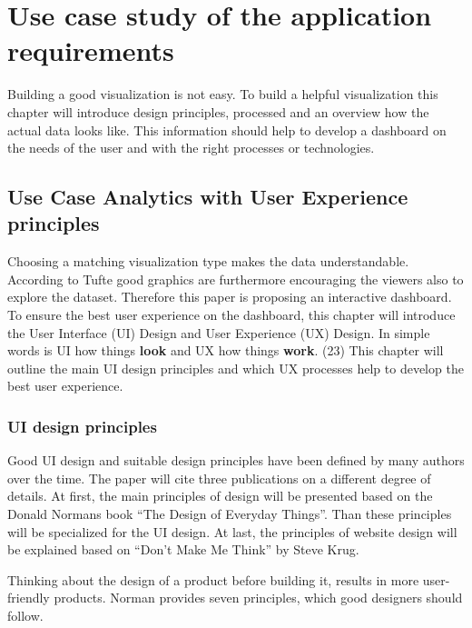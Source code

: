 \documentclass[american,a4paper,oneside,,tablecaptionabove]{scrbook}
\begin{document}
\chapter{Use case study of the application
requirements}\label{use-case-study-of-the-application-requirements}

Building a good visualization is not easy. To build a helpful
visualization this chapter will introduce design principles, processed
and an overview how the actual data looks like. This information should
help to develop a dashboard on the needs of the user and with the right
processes or technologies.

\section{Use Case Analytics with User Experience
principles}\label{use-case-analytics-with-user-experience-principles}

Choosing a matching visualization type makes the data understandable.
According to Tufte good graphics are furthermore encouraging the viewers
also to explore the dataset. Therefore this paper is proposing an
interactive dashboard. To ensure the best user experience on the
dashboard, this chapter will introduce the User Interface (UI) Design
and User Experience (UX) Design. In simple words is UI how things
\textbf{look} and UX how things \textbf{work}. (23) This chapter will
outline the main UI design principles and which UX processes help to
develop the best user experience.

\subsection{UI design principles}\label{ui-design-principles}

Good UI design and suitable design principles have been defined by many
authors over the time. The paper will cite three publications on a
different degree of details. At first, the main principles of design
will be presented based on the Donald Normans book \enquote{The Design
of Everyday Things}. Than these principles will be specialized for the
UI design. At last, the principles of website design will be explained
based on \enquote{Don't Make Me Think} by Steve Krug.

Thinking about the design of a product before building it, results in
more user-friendly products. Norman provides seven principles, which
good designers should follow.
\end{document}
